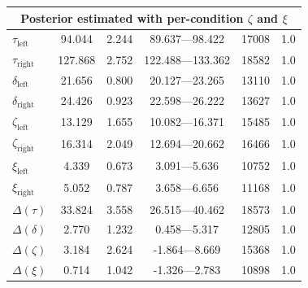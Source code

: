 \documentclass[doc,biblatex,floatsintext]{apa7}
\begin{document}
\begin{table}
\begin{center}
\begin{threeparttable}
\begin{tabular}{lccccc}
\midrule
\multicolumn{6}{c}{Posterior estimated with per-condition $\zeta$ and $\xi$} \\
\midrule
$\tau_\mathrm{left}$  &   94.044 &  2.244 &    89.637---98.422 &   17008 &    1.0 \\
$\tau_\mathrm{right}$ &  127.868 &  2.752 &   122.488---133.362 &   18582 &    1.0 \\
$\delta_\mathrm{left}$  &   21.656 &  0.800 &    20.127---23.265 &   13110 &    1.0 \\
$\delta_\mathrm{right}$ &   24.426 &  0.923 &    22.598---26.222 &   13627 &    1.0 \\
$\zeta_\mathrm{left}$  &   13.129 &  1.655 &    10.082---16.371 &   15485 &    1.0 \\
$\zeta_\mathrm{right}$ &   16.314 &  2.049 &    12.694---20.662 &   16466 &    1.0 \\
$\xi_\mathrm{left}$  &    4.339 &  0.673 &     3.091---5.636 &   10752 &    1.0 \\
$\xi_\mathrm{right}$ &    5.052 &  0.787 &     3.658---6.656 &   11168 &    1.0 \\
$\Delta(\tau)$     &   33.824 &  3.558 &    26.515---40.462 &   18573 &    1.0 \\
$\Delta(\delta)$     &    2.770 &  1.232 &     0.458---5.317 &   12805 &    1.0 \\
$\Delta(\zeta)$    &    3.184 & 2.624  &  -1.864---8.669 &  15368   & 1.0 \\
$\Delta(\xi)$     &   0.714 & 1.042  &  -1.326---2.783  & 10898  &  1.0 \\
\bottomrule
\end{tabular}
\label{supptable2}
\end{threeparttable}
\end{center}
\end{table}

\clearpage
\end{document}
